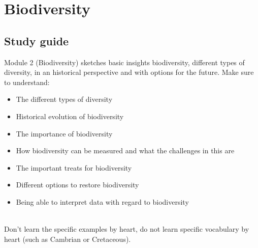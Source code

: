 \documentclass[../summary.tex]{subfiles}
\begin{document}
	
	\section{Biodiversity}
	
	\subsection{Study guide}
	
	Module 2 (Biodiversity) sketches basic insights biodiversity, different types of diversity, in an historical perspective and with options for the future. Make sure to understand:
	\begin{itemize}
		\setlength{\itemsep}{0pt}
		\item The different types of diversity
		\item Historical evolution of biodiversity
		\item The importance of biodiversity
		\item How biodiversity can be measured and what the challenges in this are
		\item The important treats for biodiversity
		\item Different options to restore biodiversity
		\item Being able to interpret data with regard to biodiversity
	\end{itemize} 
	\ \\
	Don’t learn the specific examples by heart, do not learn specific vocabulary by heart (such as Cambrian or Cretaceous).
	\\
	
\end{document}
